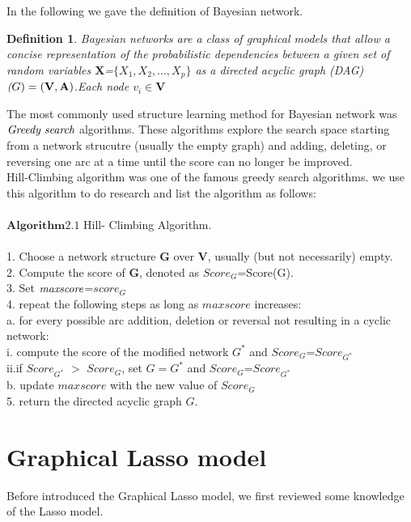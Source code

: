 \documentclass[12pt]{article}
\theoremstyle{plain}
\newtheorem{definition}[thm]{Definition}
\begin{document}
In the following we gave the definition of Bayesian network.\\
\begin{definition}
Bayesian networks are a class of graphical models that allow a concise representation of the probabilistic dependencies between a given set of random variables $\mathbf{X}$=$\{X_1,X_2,...,X_p\}$ as a directed acyclic graph (DAG) $\emph(G)=(\mathbf{V},\mathbf{A})$.Each node $\mathit{v}_i\in \mathbf{V}$
\end{definition}

The most commonly used structure learning method for Bayesian network was $\emph{Greedy search}$ algorithms. These algorithms explore the search space starting from a network strucutre (usually the empty graph) and adding, deleting, or reversing one arc at a time until the score can no longer be improved.\\
Hill-Climbing algorithm was one of the famous greedy search algorithms. we use this algorithm to do research and list the algorithm as follows:\\\\
$\mathbf{Algorithm 2.1}$ Hill- Climbing Algorithm.\\\\
1. Choose a network structure $\mathbf{G}$ over $\mathbf{V}$, usually (but not necessarily) empty.\\
2. Compute the score of $\mathbf{G}$, denoted as $Score_G$=Score(G).\\
3. Set $\emph{maxscore}$=$score_G$\\
4. repeat the following steps as long as $maxscore$ increases:\\
a. for every possible arc addition, deletion or reversal not resulting in a cyclic network:\\
i. compute the score of the modified network $G^*$ and $Score_G$=$Score_{G^*}$\\
ii.if $Score_{G^*}$ $>$ $Score_G$, set $G=G^*$ and $Score_G$=$Score_{G^*}$\\
b. update $maxscore$ with the new value of $Score_{G}$\\
5. return the directed acyclic graph $G$.\\


\section{Graphical Lasso model}

Before introduced the Graphical Lasso model, we first reviewed some knowledge of the Lasso model.
\end{document}
